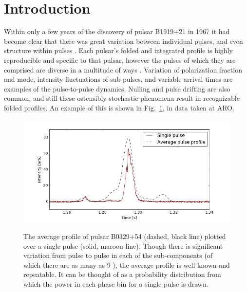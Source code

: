 \section{Introduction}

Within only a few years of the discovery of pulsar B1919+21
in 1967 it had 
become clear that there was great variation between 
individual pulses, and 
even structure within pulses 
\citep{1968Natur.218.1122C, 1975ApJ...196...83M, 1975Natur.257..293R}. 
Each pulsar's folded and integrated profile 
is highly reproducible and specific to that pulsar, 
however the pulses of which they are comprised are 
diverse in a multitude of ways \citep{1998pulsarastronomy}. 
Variation of polarization fraction and mode, intensity 
fluctuations of sub-pulses, and variable arrival times 
are examples of the pulse-to-pulse dynamics. Nulling 
and pulse drifting are also common, and still these 
ostensibly stochastic phenomena result in recognizable 
folded profiles. An example of this is shown in 
Fig.~\ref{fig-pulse_outline}, in data taken at ARO. 

\begin{figure}[!h]
\begin{center}
\includegraphics[trim={0in 0in 0in 0in}, width=1\textwidth]{./figures/microstructure/B0329_average_single.png}
\vspace{0.0cm}
\caption{The average profile of pulsar B0329+54 (dashed, black line)
plotted over a single pulse (solid, maroon line). Though 
there is significant variation from pulse to pulse in 
each of the sub-components (of which there are 
as many as 9 \citep{2001ApJ...555...31G}), 
the average profile is 
well known and repeatable. It can be thought of as a 
probability distribution from which the power in each 
phase bin for a single pulse is drawn.}  
\vspace{-0.4cm}   
\label{fig-pulse_outline}
\end{center}
\end{figure}

